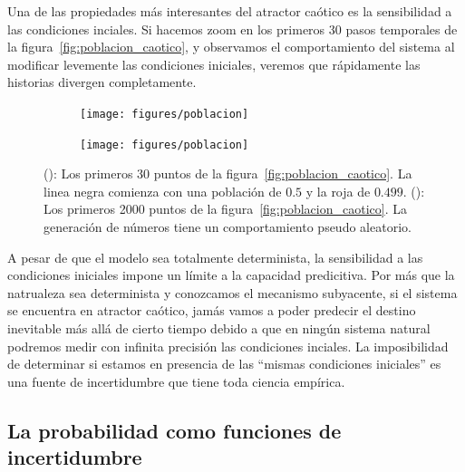 \documentclass[a4paper,10pt]{book}
\theoremstyle{definition}
\begin{document}
Una de las propiedades más interesantes del atractor caótico es la sensibilidad a las condiciones inciales.
Si hacemos zoom en los primeros 30 pasos temporales de la figura~\ref{fig:poblacion_caotico}, y observamos el comportamiento del sistema al modificar levemente las condiciones iniciales, veremos que rápidamente las historias divergen completamente.
\begin{figure}[ht!]
    \centering
    \begin{subfigure}[b]{0.4\textwidth}
    \centering
    \texttt{[image: figures/poblacion]}
    \caption{}
    \label{fig:sensibilidad}
    \end{subfigure}
    \begin{subfigure}[b]{0.4\textwidth}
    \centering
    \texttt{[image: figures/poblacion]}
    \caption{}
    \label{fig:pseudo_aleatorio}
    \end{subfigure}
    \caption{(): Los primeros 30 puntos de la figura~\ref{fig:poblacion_caotico}. La linea negra comienza con una población de $0.5$ y la roja de $0.499$. (): Los primeros 2000 puntos de la figura~\ref{fig:poblacion_caotico}. La generación de números tiene un comportamiento pseudo aleatorio.}
    \label{fig:propiedades_caoticas}
\end{figure}
A pesar de que el modelo sea totalmente determinista, la sensibilidad a las condiciones iniciales impone un límite a la capacidad predicitiva.
Por más que la natrualeza sea determinista y conozcamos el mecanismo subyacente, si el sistema se encuentra en atractor caótico, jamás vamos a poder predecir el destino inevitable más allá de cierto tiempo debido a que en ningún sistema natural podremos medir con infinita precisión las condiciones inciales.
La imposibilidad de determinar si estamos en presencia de las ``mismas condiciones iniciales'' es una fuente de incertidumbre que tiene toda ciencia empírica.

\subsection{La probabilidad como funciones de incertidumbre}
\end{document}
